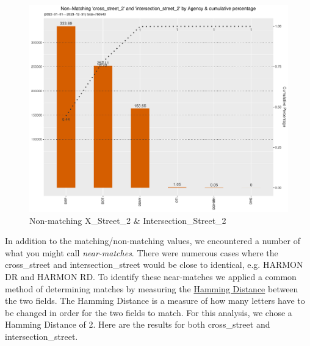 \documentclass[12pt, titlepage]{article}
\begin{document}
\begin{figure}[tbp]
	\centering
	\includegraphics[width = \textwidth]
	{non-matchingcross_street_2andintersection_street_2.pdf}
	\caption{Non-matching X\_Street\_2 \& Intersection\_Street\_2}
	\label{fig:xstreet2}
\end{figure}	

In addition to the matching/non-matching values, we encountered a number 
of what you might call \emph{near-matches}. There were numerous cases 
where the cross\_street and intersection\_street would be close to 
identical, e.g. HARMON DR and HARMON RD. To identify these 
near-matches we applied a common method of determining matches 
by measuring  the \href{https://en.wikipedia.org/wiki/Hamming_distance}
{Hamming Distance} between the two fields. The Hamming Distance is a 
measure of how many letters have to be changed in order for the two 
fields to match. For this analysis, we chose a Hamming Distance of 2. Here 
are the results for both cross\_street and intersection\_street.
\end{document}

